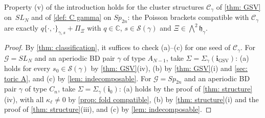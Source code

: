 \documentclass[a4paper]{amsart}
\numberwithin{equation}{section}
\theoremstyle{definition}
\theoremstyle{remark}
\newcommand{\bbC}{\mathbb{C}}
\newcommand{\mfh}{\mathfrak{h}}
\newcommand{\mcG}{\mathcal{G}}
\newcommand{\mcC}{\mathcal{C}}
\newcommand{\mcS}{\mathcal{S}}
\newcommand{\bfi}{\mathbf{i}}
\newcommand{\toric}{\Pi}
\newcommand{\Sp}{Sp_{2n}}
\begin{document}
\begin{corollary}
  \label{cor: classification}
  Property (v) of the introduction holds for the cluster structures $\mcC_\gamma$ of \cref{thm: GSV} on~$SL_N$ and of \cref{def: C gamma} on $\Sp$: the Poisson brackets compatible with $\mcC_\gamma$ are exactly ${q\{\cdot,\cdot\}_{\gamma,s}+\toric_\Xi}$ with $q\in\bbC$, $s\in\mcS(\gamma)$ and $\Xi\in\bigwedge^2\mfh_\gamma$.
\end{corollary}
\begin{proof}
  By \cref{thm: classification}, it suffices to check (a)--(c) for one seed of $\mcC_\gamma$.
  For $\mcG=SL_N$ and an aperiodic BD pair $\gamma$ of type $A_{N-1}$, take $\Sigma=\Sigma_\gamma(\bfi_\mathrm{GSV})$: (a) holds for every $s_0\in\mcS(\gamma)$ by \cref{thm: GSV}(iv), (b) by \cref{thm: GSV}(i) and \cref{sec: toric A}, and (c) by \cref{lem: indecomposable}.
  For $\mcG=\Sp$ and an aperiodic BD pair $\gamma$ of type $C_n$, take $\Sigma=\Sigma_\gamma(\bfi_0)$: (a) holds by the proof of \cref{thm: structure}(iv), with all $\kappa_\ell\neq0$ by \cref{prop: fold compatible}, (b) by \cref{thm: structure}(i) and the proof of \cref{thm: structure}(iii), and (c) by \cref{lem: indecomposable}.
\end{proof}
\end{document}
